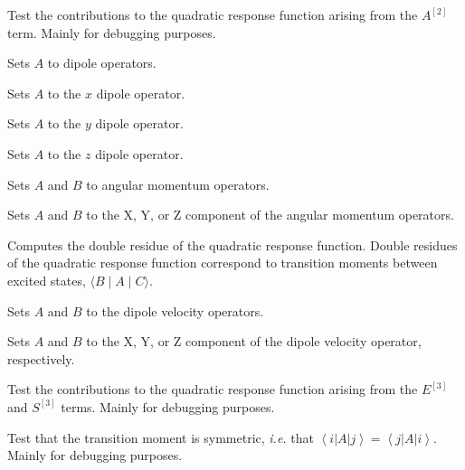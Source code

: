\begin{description}

\item{}
Test the contributions to the quadratic response function arising from
the $A^{\left[2\right]}$ term. Mainly for debugging purposes.

\item{}
Sets $A$ to dipole operators.

\item{}
Sets $A$ to the $x$ dipole operator.

\item{}
Sets $A$ to the $y$ dipole operator.

\item{}
Sets $A$ to the $z$ dipole operator.

\item{}
Sets $A$ and $B$ to angular momentum operators.

\item{}
Sets $A$ and $B$ to the X, Y, or Z component of the angular momentum operators.

\item{}
Computes the double residue
of the quadratic
response function.
Double residues of the quadratic response function correspond to transition
moments between excited states,
$\langle B \mid A \mid C \rangle$. 

\item{}
Sets $A$ and $B$ to the dipole velocity operators.

\item{}
Sets $A$ and $B$ to the X, Y, or Z component of the dipole velocity
operator, respectively.

\item{}
Test the contributions to the quadratic response function arising from
the $E^{\left[3\right]}$ and $S^{\left[3\right]}$ terms.  Mainly for
debugging purposes. 

\item{}
Test that the transition moment is symmetric, {\it i.e.\/} that
$\left<i\left|A\right|j\right> =
\left<j\left|A\right|i\right>$. Mainly for debugging purposes.


\end{description}
